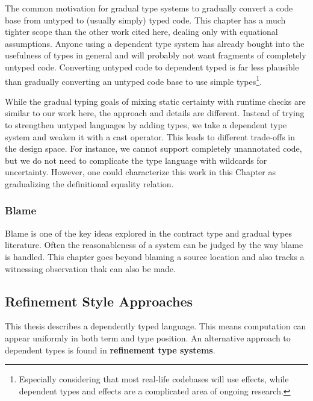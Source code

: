 The common motivation for gradual type systems to gradually convert a code base from untyped to (usually simply) typed code.
This chapter has a much tighter scope than the other work cited here, dealing only with equational assumptions.
Anyone using a dependent type system has already bought into the usefulness of types in general and will probably not want fragments of completely untyped code.
Converting untyped code to dependent typed is far less plausible than gradually converting an untyped code base to use simple types\footnote{
 Especially considering that most real-life codebases will use effects, while dependent types and effects are a complicated area of ongoing research.
}.
 
While the gradual typing goals of mixing static certainty with runtime checks are similar to our work here, the approach and details are different.
Instead of trying to strengthen untyped languages by adding types, we take a dependent type system and weaken it with a cast operator.
This leads to different trade-offs in the design space.
For instance, we cannot support completely unannotated code, but we do not need to complicate the type language with wildcards for uncertainty.
However, one could characterize this work in this Chapter as gradualizing the definitional equality relation.
 
\subsubsection{Blame}
 
Blame is one of the key ideas explored in the contract type and gradual types literature\cite{10.1007/978-3-642-00590-9_1,wadler:LIPIcs:2015:5033,10.1145/3110283}.
Often the reasonableness of a system can be judged by the way blame is handled\cite{wadler:LIPIcs:2015:5033}.
This chapter goes beyond blaming a source location and also tracks a witnessing observation thak can also be made.
 
\subsection{Refinement Style Approaches}
 
This thesis describes a \fullSp{} dependently typed language.
This means computation can appear uniformly in both term and type position.
An alternative approach to dependent types is found in \textbf{refinement type systems}.
 
